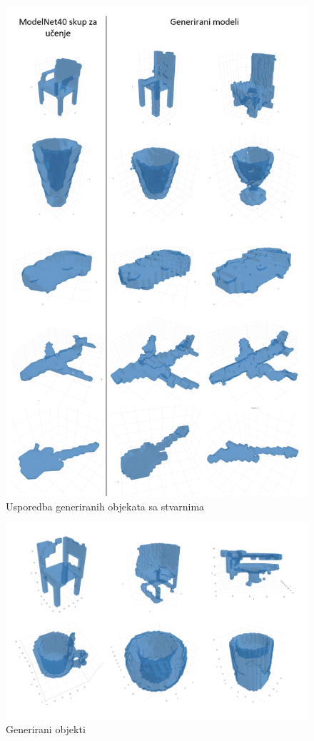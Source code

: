 \documentclass[times, utf8, diplomski]{fer}
\begin{document}
\break

\begin{figure}[h]
\centering
\includegraphics[scale=0.65]{primjeri.png}   
\caption{Usporedba generiranih objekata sa stvarnima}
\end{figure}

\clearpage

\begin{figure}[h]
\centering
\includegraphics[scale=0.6]{primjeri_weird.png}   
\caption{Generirani objekti}
\end{figure}
\end{document}
